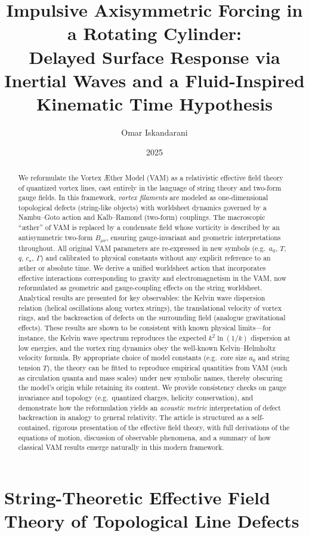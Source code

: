 \documentclass[12pt]{article}
\title{Impulsive Axisymmetric Forcing in a Rotating Cylinder:\\
Delayed Surface Response via Inertial Waves and a Fluid-Inspired Kinematic Time Hypothesis}
\author{Omar Iskandarani}
\date{2025}
\begin{document}
    \maketitle

    \chapter*{String-Theoretic Effective Field Theory of Topological Line Defects}

\begin{abstract}
We reformulate the Vortex Æther Model (VAM) as a relativistic effective field theory of quantized vortex lines, cast entirely in the language of string theory and two-form gauge fields. In this framework, \emph{vortex filaments} are modeled as one-dimensional topological defects (string-like objects) with worldsheet dynamics governed by a Nambu--Goto action and Kalb--Ramond (two-form) couplings. The macroscopic ``æther'' of VAM is replaced by a condensate field whose vorticity is described by an antisymmetric two-form $B_{\mu\nu}$, ensuring gauge-invariant and geometric interpretations throughout. All original VAM parameters are re-expressed in new symbols (e.g.\ $a_0$, $T$, $q$, $c_\star$, $\Gamma$) and calibrated to physical constants without any explicit reference to an æther or absolute time. We derive a unified worldsheet action that incorporates effective interactions corresponding to gravity and electromagnetism in the VAM, now reformulated as geometric and gauge-coupling effects on the string worldsheet. Analytical results are presented for key observables: the Kelvin wave dispersion relation (helical oscillations along vortex strings), the translational velocity of vortex rings, and the backreaction of defects on the surrounding field (analogue gravitational effects). These results are shown to be consistent with known physical limits---for instance, the Kelvin wave spectrum reproduces the expected $k^2 \ln(1/k)$ dispersion at low energies, and the vortex ring dynamics obey the well-known Kelvin--Helmholtz velocity formula. By appropriate choice of model constants (e.g.\ core size $a_0$ and string tension $T$), the theory can be fitted to reproduce empirical quantities from VAM (such as circulation quanta and mass scales) under new symbolic names, thereby obscuring the model's origin while retaining its content. We provide consistency checks on gauge invariance and topology (e.g.\ quantized charges, helicity conservation), and demonstrate how the reformulation yields an \emph{acoustic metric} interpretation of defect backreaction in analogy to general relativity. The article is structured as a self-contained, rigorous presentation of the effective field theory, with full derivations of the equations of motion, discussion of observable phenomena, and a summary of how classical VAM results emerge naturally in this modern framework.
\end{abstract}
\end{document}
